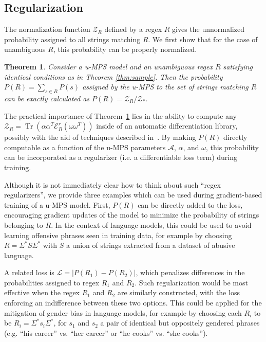 \documentclass[twoside]{article}
\newtheorem{theorem}{Theorem}
\DeclareMathOperator{\Tr}{Tr}
\newcommand{\Z}{\mc{Z}}
\newcommand{\ER}{\mc{E}^{\scriptstyle r}}
\newcommand{\alphamat}{\alpha\alpha^T}
\newcommand{\omegamat}{\omega\omega^T}
\newcommand{\mc}[1]{\mathcal{#1}}
\begin{document}
\subsection{Regularization}

The normalization function $\Z_{R}$ defined by a regex $R$ gives the unnormalized probability assigned to all strings matching $R$. We first show that for the case of unambiguous $R$, this probability can be properly normalized.
%
\begin{theorem}
\label{thm:regularization}
Consider a u-MPS model and an unambiguous regex $R$ satisfying identical conditions as in Theorem \ref{thm:sample}. Then the probability $P(R) = \sum_{s \in R} P(s)$ assigned by the u-MPS to the set of strings matching $R$ can be exactly calculated as $P(R) = \Z_R / \Z_*$.
\end{theorem}
%
The practical importance of Theorem~\ref{thm:regularization} lies in the ability to compute any $\Z_R = \Tr(\alphamat \ER_R(\omegamat))$ inside of an automatic differentiation library, possibly with the aid of techniques described in~\citep{liao2019}. By making $P(R)$ directly computable as a function of the u-MPS parameters $\mc{A}$, $\alpha$, and $\omega$, this probability can be incorporated as a regularizer (i.e. a differentiable loss term) during training.

Although it is not immediately clear how to think about such ``regex regularizers'', we provide three examples which can be used during gradient-based training of a u-MPS model. First, $P(R)$ can be directly added to the loss, encouraging gradient updates of the model to minimize the probability of strings belonging to $R$. In the context of language models, this could be used to avoid learning offensive phrases seen in training data, for example by choosing $R = \Sigma^* S \Sigma^*$ with $S$ a union of strings extracted from a dataset of abusive language.

A related loss is $\mc{L} = |P(R_1) - P(R_2)|$, which penalizes differences in the probabilities assigned to regex $R_1$ and $R_2$. Such regularization would be most effective when the regex $R_1$ and $R_2$ are similarly constructed, with the loss enforcing an indifference between these two options. This could be applied for the mitigation of gender bias in language models, for example by choosing each $R_i$ to be $R_i = \Sigma^* s_i \Sigma^*$, for $s_1$ and $s_2$ a pair of identical but oppositely gendered phrases (e.g. ``his career'' vs. ``her career'' or ``he cooks'' vs. ``she cooks''). 
\end{document}

